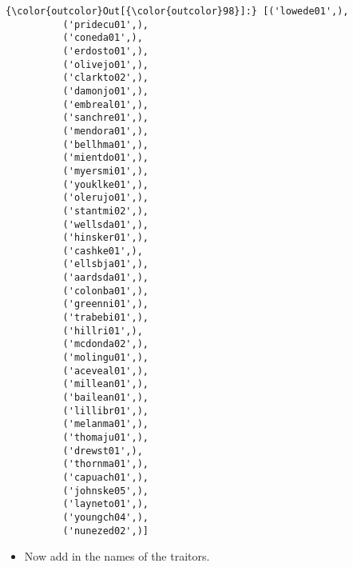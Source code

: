 \documentclass[11pt]{article}
\providecommand{\tightlist}{%
      \setlength{\itemsep}{0pt}\setlength{\parskip}{0pt}}
\begin{document}
\begin{Verbatim}[commandchars=\\\{\}]
{\color{outcolor}Out[{\color{outcolor}98}]:} [('lowede01',),
          ('pridecu01',),
          ('coneda01',),
          ('erdosto01',),
          ('olivejo01',),
          ('clarkto02',),
          ('damonjo01',),
          ('embreal01',),
          ('sanchre01',),
          ('mendora01',),
          ('bellhma01',),
          ('mientdo01',),
          ('myersmi01',),
          ('youklke01',),
          ('olerujo01',),
          ('stantmi02',),
          ('wellsda01',),
          ('hinsker01',),
          ('cashke01',),
          ('ellsbja01',),
          ('aardsda01',),
          ('colonba01',),
          ('greenni01',),
          ('trabebi01',),
          ('hillri01',),
          ('mcdonda02',),
          ('molingu01',),
          ('aceveal01',),
          ('millean01',),
          ('bailean01',),
          ('lillibr01',),
          ('melanma01',),
          ('thomaju01',),
          ('drewst01',),
          ('thornma01',),
          ('capuach01',),
          ('johnske05',),
          ('layneto01',),
          ('youngch04',),
          ('nunezed02',)]
\end{Verbatim}
            
    \begin{itemize}
\tightlist
\item
  Now add in the names of the traitors.
\end{itemize}
\end{document}

